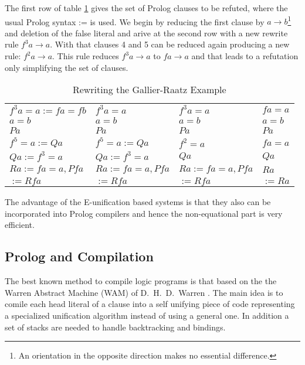 \begin{Ex}
\label{GallierRaatz}
\return
The first row of table \ref{RewritingtheGallierRaatzExample} gives the 
set of Prolog clauses to be refuted, where the usual Prolog syntax := is used.
We begin by reducing the first clause
by $a\rightarrow b$\footnote{An orientation in the opposite direction makes
no essential difference.} and deletion of the 
false literal and arive at the second row
with a new rewrite rule $f^3a\rightarrow a$. With that clauses 4 and 5 can be reduced
again producing a new rule: $f^2a \rightarrow a$. This 
rule reduces $f^3a\rightarrow a$ to $fa\rightarrow a$
and that leads to a refutation only simplifying the set of clauses.
\begin{table}
\caption{Rewriting the Gallier-Raatz Example}
\label{RewritingtheGallierRaatzExample}
\begin{center}
\begin{tabular}{|l|l|l|l|}
\hline
$f^3a=a := fa=fb$ & $f^3a=a$         & $f^3a=a$         & $fa=a$  \\
$a=b$             & $a=b$            & $a=b$            & $a=b$   \\
$Pa$              & $Pa$             & $Pa$             & $Pa$    \\
$f^5=a := Qa$     & $f^5=a := Qa$    & $f^2=a$          & $fa=a$  \\
$Qa := f^3=a$     & $Qa := f^3=a$    & $Qa$             & $Qa$    \\
$Ra := fa=a,Pfa$  & $Ra := fa=a,Pfa$ & $Ra := fa=a,Pfa$ & $Ra$    \\
$ := Rfa$         & $ := Rfa$        & $ := Rfa$        & $ := Ra$\\
\hline
\end{tabular}
\end{center}
\end{table}
\end{Ex}

The advantage of the E-unification based systems is that they also can be incorporated 
into Prolog compilers and hence the non-equational part is very efficient.

\subsection{Prolog and Compilation}
The best known method to compile logic programs is that based on the the Warren
Abstract Machine (WAM) of D.\ H.\ D.\ Warren \cite{Warren77,Warren83,GaLiLuOv84}. 
The main idea is to comile each head literal of a clause into a self unifying
piece of code representing a specialized unification algorithm instead of using
a general one. In addition a set of stacks are needed to handle backtracking and
bindings.

